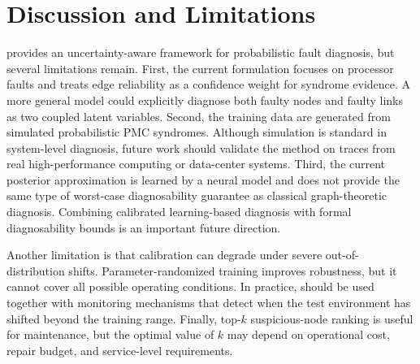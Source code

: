 \section{Discussion and Limitations}\label{sec:limitation}

\tool provides an uncertainty-aware framework for probabilistic fault diagnosis, but several limitations remain. First, the current formulation focuses on processor faults and treats edge reliability as a confidence weight for syndrome evidence. A more general model could explicitly diagnose both faulty nodes and faulty links as two coupled latent variables. Second, the training data are generated from simulated probabilistic PMC syndromes. Although simulation is standard in system-level diagnosis, future work should validate the method on traces from real high-performance computing or data-center systems. Third, the current posterior approximation is learned by a neural model and does not provide the same type of worst-case diagnosability guarantee as classical graph-theoretic diagnosis. Combining calibrated learning-based diagnosis with formal diagnosability bounds is an important future direction.

Another limitation is that calibration can degrade under severe out-of-distribution shifts. Parameter-randomized training improves robustness, but it cannot cover all possible operating conditions. In practice, \tool should be used together with monitoring mechanisms that detect when the test environment has shifted beyond the training range. Finally, top-$k$ suspicious-node ranking is useful for maintenance, but the optimal value of $k$ may depend on operational cost, repair budget, and service-level requirements.